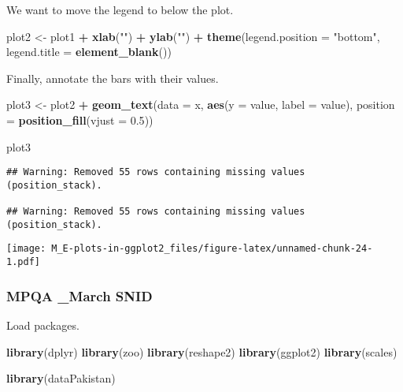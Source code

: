 \documentclass[]{article}
\newenvironment{Shaded}{\begin{snugshade}}{\end{snugshade}}
\newcommand{\DataTypeTok}[1]{\textcolor[rgb]{0.13,0.29,0.53}{#1}}
\newcommand{\FloatTok}[1]{\textcolor[rgb]{0.00,0.00,0.81}{#1}}
\newcommand{\KeywordTok}[1]{\textcolor[rgb]{0.13,0.29,0.53}{\textbf{#1}}}
\newcommand{\NormalTok}[1]{#1}
\newcommand{\OperatorTok}[1]{\textcolor[rgb]{0.81,0.36,0.00}{\textbf{#1}}}
\newcommand{\StringTok}[1]{\textcolor[rgb]{0.31,0.60,0.02}{#1}}
\begin{document}
We want to move the legend to below the plot.

\begin{Shaded}
\begin{Highlighting}[]
\NormalTok{plot2 <-}\StringTok{ }
\StringTok{  }\NormalTok{plot1 }\OperatorTok{+}
\StringTok{  }\KeywordTok{xlab}\NormalTok{(}\StringTok{""}\NormalTok{) }\OperatorTok{+}\StringTok{ }\KeywordTok{ylab}\NormalTok{(}\StringTok{""}\NormalTok{) }\OperatorTok{+}
\StringTok{  }\KeywordTok{theme}\NormalTok{(}\DataTypeTok{legend.position =} \StringTok{"bottom"}\NormalTok{, }\DataTypeTok{legend.title =} \KeywordTok{element_blank}\NormalTok{())}
\end{Highlighting}
\end{Shaded}

Finally, annotate the bars with their values.

\begin{Shaded}
\begin{Highlighting}[]
\NormalTok{plot3 <-}\StringTok{ }
\StringTok{  }\NormalTok{plot2 }\OperatorTok{+}
\StringTok{  }\KeywordTok{geom_text}\NormalTok{(}\DataTypeTok{data =}\NormalTok{ x, }\KeywordTok{aes}\NormalTok{(}\DataTypeTok{y =}\NormalTok{ value, }\DataTypeTok{label =}\NormalTok{ value), }\DataTypeTok{position =} \KeywordTok{position_fill}\NormalTok{(}\DataTypeTok{vjust =} \FloatTok{0.5}\NormalTok{))}

\NormalTok{plot3}
\end{Highlighting}
\end{Shaded}

\begin{verbatim}
## Warning: Removed 55 rows containing missing values (position_stack).

## Warning: Removed 55 rows containing missing values (position_stack).
\end{verbatim}

\texttt{[image: M\_E-plots-in-ggplot2\_files/figure-latex/unnamed-chunk-24-1.pdf]}

\hypertarget{mpqa-_march-snid}{%
\subsubsection{MPQA \_March SNID}\label{mpqa-_march-snid}}

Load packages.

\begin{Shaded}
\begin{Highlighting}[]
\KeywordTok{library}\NormalTok{(dplyr)}
\KeywordTok{library}\NormalTok{(zoo)}
\KeywordTok{library}\NormalTok{(reshape2)}
\KeywordTok{library}\NormalTok{(ggplot2)}
\KeywordTok{library}\NormalTok{(scales)}

\KeywordTok{library}\NormalTok{(dataPakistan)}
\end{Highlighting}
\end{Shaded}
\end{document}
